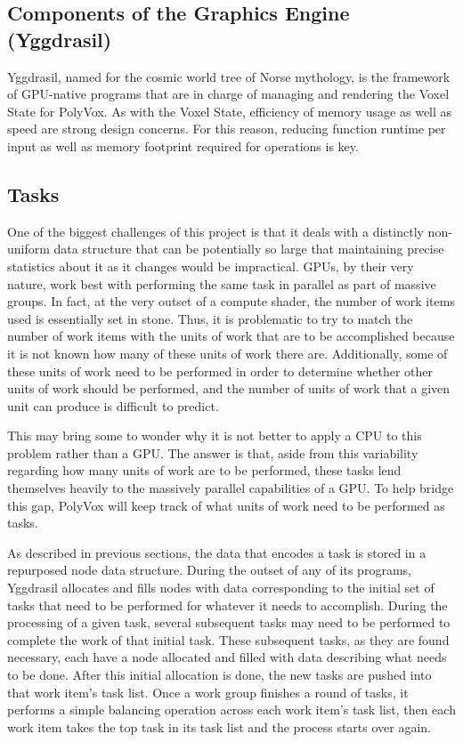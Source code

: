 \documentclass[onecolumn, draftclsnofoot,10pt, compsoc]{IEEEtran}
\begin{document}
\subsection{Components of the Graphics Engine (Yggdrasil)}

Yggdrasil, named for the cosmic world tree of Norse mythology, is the framework of GPU-native programs that are in charge of managing and rendering the Voxel State for PolyVox. As with the Voxel State, efficiency of memory usage as well as speed are strong design concerns. For this reason, reducing function runtime per input as well as memory footprint required for operations is key.


\subsection{Tasks}

One of the biggest challenges of this project is that it deals with a distinctly non-uniform data structure that can be potentially so large that maintaining precise statistics about it as it changes would be impractical. GPUs, by their very nature, work best with performing the same task in parallel as part of massive groups. In fact, at the very outset of a compute shader, the number of work items used is essentially set in stone. Thus, it is problematic to try to match the number of work items with the units of work that are to be accomplished because it is not known how many of these units of work there are. Additionally, some of these units of work need to be performed in order to determine whether other units of work should be performed, and the number of units of work that a given unit can produce is difficult to predict.

This may bring some to wonder why it is not better to apply a CPU to this problem rather than a GPU. The answer is that, aside from this variability regarding how many units of work are to be performed, these tasks lend themselves heavily to the massively parallel capabilities of a GPU. To help bridge this gap, PolyVox will keep track of what units of work need to be performed as tasks.

As described in previous sections, the data that encodes a task is stored in a repurposed node data structure. During the outset of any of its programs,
Yggdrasil allocates and fills nodes with data corresponding to the initial set of tasks that need to be performed for whatever it needs to accomplish. During the processing of a given task, several subsequent tasks may need to be performed to complete the work of that initial task. These subsequent tasks, as they are found necessary, each have a node allocated and filled with data describing what needs to be done. After this initial allocation is done, the new tasks are pushed into that work item’s task list. Once a work group finishes a round of tasks, it performs a simple balancing operation across each work item’s task list, then each work item takes the top task in its task list and the process starts over again.
\end{document}
